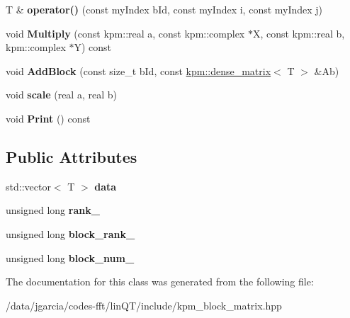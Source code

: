 \begin{DoxyCompactItemize}
\item 
T \& {\bfseries operator()} (const my\+Index b\+Id, const my\+Index i, const my\+Index j)\hypertarget{classkpm_1_1BlockMatrix_a0c943ad0423d97b414a3f77b6c2ce299}{}\label{classkpm_1_1BlockMatrix_a0c943ad0423d97b414a3f77b6c2ce299}

\item 
void {\bfseries Multiply} (const kpm\+::real a, const kpm\+::complex $\ast$X, const kpm\+::real b, kpm\+::complex $\ast$Y) const \hypertarget{classkpm_1_1BlockMatrix_ac946dd0c12ce1c1152593351d8b33277}{}\label{classkpm_1_1BlockMatrix_ac946dd0c12ce1c1152593351d8b33277}

\item 
void {\bfseries Add\+Block} (const size\+\_\+t b\+Id, const \hyperlink{classkpm_1_1dense__matrix}{kpm\+::dense\+\_\+matrix}$<$ T $>$ \&Ab)\hypertarget{classkpm_1_1BlockMatrix_a49748728cf3a621e47996807b46e87d3}{}\label{classkpm_1_1BlockMatrix_a49748728cf3a621e47996807b46e87d3}

\item 
void {\bfseries scale} (real a, real b)\hypertarget{classkpm_1_1BlockMatrix_a14f396fb89f613b3b9858f327871fd71}{}\label{classkpm_1_1BlockMatrix_a14f396fb89f613b3b9858f327871fd71}

\item 
void {\bfseries Print} () const \hypertarget{classkpm_1_1BlockMatrix_ac9af5537765b49a837ef5f50f59eaa5c}{}\label{classkpm_1_1BlockMatrix_ac9af5537765b49a837ef5f50f59eaa5c}

\end{DoxyCompactItemize}
\subsection*{Public Attributes}
\begin{DoxyCompactItemize}
\item 
std\+::vector$<$ T $>$ {\bfseries data}\hypertarget{classkpm_1_1BlockMatrix_a3caed25e8c38aa5bc672d40c332216bb}{}\label{classkpm_1_1BlockMatrix_a3caed25e8c38aa5bc672d40c332216bb}

\item 
unsigned long {\bfseries rank\+\_\+}\hypertarget{classkpm_1_1BlockMatrix_aec1625a2f818575d803b038d54870d52}{}\label{classkpm_1_1BlockMatrix_aec1625a2f818575d803b038d54870d52}

\item 
unsigned long {\bfseries block\+\_\+rank\+\_\+}\hypertarget{classkpm_1_1BlockMatrix_ada333d244820a88bceeeec146a6fd18f}{}\label{classkpm_1_1BlockMatrix_ada333d244820a88bceeeec146a6fd18f}

\item 
unsigned long {\bfseries block\+\_\+num\+\_\+}\hypertarget{classkpm_1_1BlockMatrix_af4df6d6feeab8ff37cf4f65ab120df95}{}\label{classkpm_1_1BlockMatrix_af4df6d6feeab8ff37cf4f65ab120df95}

\end{DoxyCompactItemize}


The documentation for this class was generated from the following file\+:\begin{DoxyCompactItemize}
\item 
/data/jgarcia/codes-\/fft/lin\+Q\+T/include/kpm\+\_\+block\+\_\+matrix.\+hpp\end{DoxyCompactItemize}
